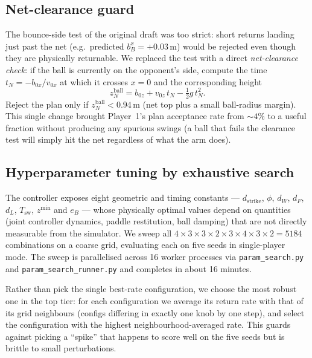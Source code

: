 \subsection{Net-clearance guard}

The bounce-side test of the original draft was too strict: short returns
landing just past the net (e.g.\ predicted $b_{B}^{x}=+0.03$\,m) would
be rejected even though they are physically returnable. We replaced the
test with a direct \emph{net-clearance check}: if the ball is currently
on the opponent's side, compute the time $t_{N}=-b_{0x}/v_{0x}$ at which
it crosses $x=0$ and the corresponding height
\[
  z_{N}^{\mathrm{ball}}=b_{0z}+v_{0z}\,t_{N}-\tfrac{1}{2}g\,t_{N}^{2}.
\]
Reject the plan only if $z_{N}^{\mathrm{ball}}<0.94$\,m (net top plus a
small ball-radius margin). This single change brought Player~1's plan
acceptance rate from $\sim 4\%$ to a useful fraction without producing
any spurious swings (a ball that fails the clearance test will simply
hit the net regardless of what the arm does).

\subsection{Hyperparameter tuning by exhaustive search}
\label{sub:tune}

The controller exposes eight geometric and timing constants ---
$d_{\mathrm{strike}}$, $\phi$, $d_{W}$, $d_{F}$, $d_{L}$,
$T_{\mathrm{sw}}$, $z^{\min}$ and $e_{B}$ --- whose physically optimal
values depend on quantities (joint controller dynamics, paddle
restitution, ball damping) that are not directly measurable from the
simulator. We sweep all $4\times 3\times 3\times 2\times 3\times 4\times 3\times 2=5184$
combinations on a coarse grid, evaluating each on five seeds in
single-player mode. The sweep is parallelised across 16 worker
processes via \texttt{param\_search.py} and \texttt{param\_search\_runner.py}
and completes in about 16 minutes.

Rather than pick the single best-rate configuration, we choose the
most robust one in the top tier: for each configuration we average its
return rate with that of its grid neighbours (configs differing in
exactly one knob by one step), and select the configuration with the
highest neighbourhood-averaged rate. This guards against picking a
``spike'' that happens to score well on the five seeds but is brittle to
small perturbations.
